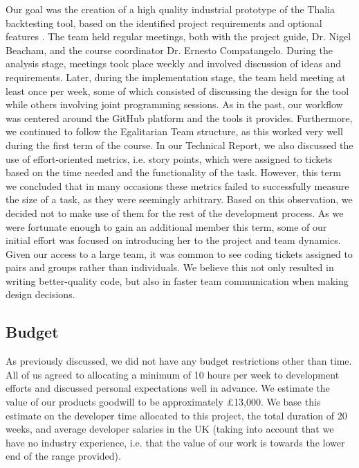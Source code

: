 \documentclass[main.tex]{subfiles}
\begin{document}
Our goal was the creation of a high quality industrial prototype of the Thalia backtesting tool, based on the identified project requirements and optional features \cite{TR}. The team held regular meetings, both with the project guide, Dr. Nigel Beacham, and the course coordinator Dr. Ernesto Compatangelo. During the analysis stage, meetings took place weekly and involved discussion of ideas and requirements. Later, during the implementation stage, the team held meeting at least once per week, some of which consisted of discussing the design for the tool while others involving joint programming sessions. \newline \newline
As in the past\cite{TR}, our workflow was centered around the GitHub platform and the tools it provides.
Furthermore, we continued to follow the Egalitarian Team structure, as this worked very well during the first term of the course.
In our Technical Report, we also discussed the use of effort-oriented metrics, i.e. story points, which were assigned to tickets based on the time needed and the functionality of the task.
However, this term we concluded that in many occasions these metrics failed to successfully measure the size of a task, as they were seemingly arbitrary. Based on this observation, we decided not to make use of them for the rest of the development process. \newline \newline
As we were fortunate enough to gain an additional member this term, some of our initial effort was focused on introducing her to the project and team dynamics. Given our access to a large team, it was common to see coding tickets assigned to pairs and groups rather than individuals. We believe this not only resulted in writing better-quality code, but also in faster team communication when making design decisions.

\subsection{Budget}
As previously discussed, we did not have any budget restrictions other than time. All of us agreed to allocating a minimum of 10 hours per week to development efforts and discussed personal expectations well in advance.  We estimate the value of our products goodwill to be approximately £13,000. We base this estimate on the developer time allocated to this project, the total duration of 20 weeks, and average developer salaries in the UK \cite{DeveloperSalary} (taking into account that we have no industry experience, i.e. that the value of our work is towards the lower end of the range provided).
\end{document}

